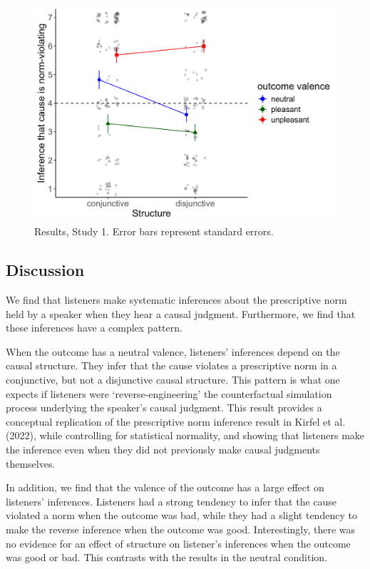 \documentclass[fleqn,reqno,10pt]{article}
\begin{document}
\begin{figure}[ht]
\begin{center}
\includegraphics[scale=.5]{ResultsStudy1.png}
\end{center}
\caption{Results, Study 1. Error bars represent standard errors.}
\label{fig:resultsStudy1}
\end{figure}


\subsection{Discussion}
We find that listeners make systematic inferences about the prescriptive norm held by a speaker when they hear a causal judgment. Furthermore, we find that these inferences have a complex pattern.

When the outcome has a neutral valence, listeners' inferences depend on the causal structure. They infer that the cause violates a prescriptive norm in a conjunctive, but not a disjunctive causal structure. This pattern is what one expects if listeners were `reverse-engineering' the counterfactual simulation process underlying the speaker's causal judgment. This result provides a conceptual replication of the prescriptive norm inference result in Kirfel et al. (2022), while controlling for statistical normality, and showing that listeners make the inference even when they did not previously make causal judgments themselves.

In addition, we find that the valence of the outcome has a large effect on listeners' inferences. Listeners had a strong tendency to infer that the cause violated a norm when the outcome was bad, while they had a slight tendency to make the reverse inference when the outcome was good. Interestingly, there was no evidence for an effect of structure on listener's inferences when the outcome was good or bad. This contrasts with the results in the neutral condition. 
\end{document}
